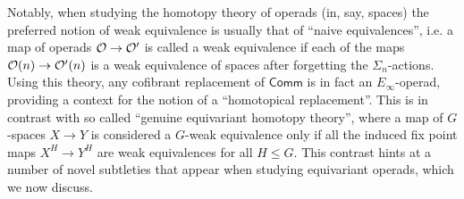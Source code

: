\documentclass[a4paper,10pt]{article}%
\begin{document}

Notably, when studying the homotopy theory of operads
(in, say, spaces)
the preferred notion of weak equivalence is 
usually that of ``naive equivalences'',
i.e. a map of operads 
$\mathcal{O} \to \mathcal{O}'$
is called a weak equivalence if each of the maps
$\mathcal{O}(n) \to \mathcal{O}'(n)$
is a weak equivalence of spaces
after forgetting the $\Sigma_n$-actions.
Using this theory, any cofibrant replacement of $\mathsf{Comm}$ is in fact an $E_\infty$-operad, providing a context for the notion of a ``homotopical replacement''.
This is in contrast with so called ``genuine equivariant homotopy theory'', where a map of $G$-spaces $X \to Y$ is considered a $G$-weak equivalence only if all the induced fix point maps $X^H \to Y^H$ are weak equivalences for all $H\leq G$.
This contrast hints at a number of novel subtleties that appear when studying equivariant operads, which we now discuss.
\end{document}

